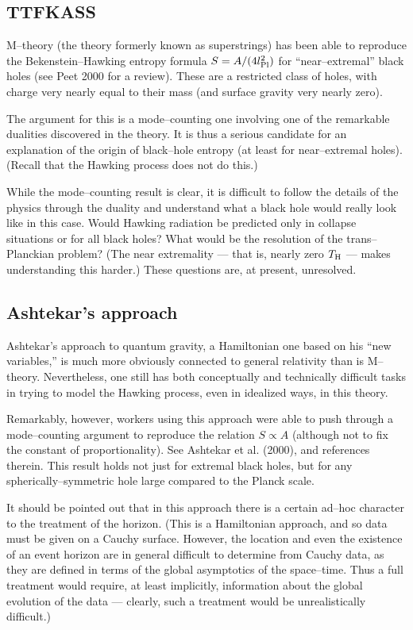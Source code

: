 \subsection{TTFKASS}

M--theory (the theory formerly known as superstrings) has been able to
reproduce the Bekenstein--Hawking entropy formula $S=A/(4l_{\rm Pl}^2)$ for
``near--extremal'' black holes (see Peet 2000 for a review).   These are a
restricted class of holes, with charge very nearly equal to their mass (and
surface gravity very nearly zero). 

The argument for this is a mode--counting one involving one of the remarkable
dualities discovered in the theory.  It is thus a serious candidate for an
explanation of the origin of  black--hole entropy (at least for near--extremal
holes).   (Recall that the Hawking process does not do this.)

While the mode--counting result is clear, it is difficult to follow the details
of the physics through the duality and understand what a black hole would
really look like in this case.  Would Hawking radiation be predicted only in
collapse situations or for all black holes?   What would be the resolution of
the trans--Planckian problem?  (The near extremality --- that is, nearly zero
$T_{\rm H}$ --- makes understanding this harder.)  These questions are, at
present, unresolved.

\subsection{Ashtekar's approach}

Ashtekar's approach to quantum gravity, a Hamiltonian one based on his ``new
variables,'' is much more obviously connected to general relativity than is
M--theory.  Nevertheless,  one still has both conceptually and technically
difficult tasks in trying to model the Hawking process, even in idealized ways,
in this theory.  

Remarkably, however, workers using this approach were able to push through a
mode--counting argument to reproduce the relation $S\propto A$ (although not to
fix the constant of proportionality).  See Ashtekar et al. (2000), and
references therein.  This result holds not just for extremal black holes, but
for any spherically--symmetric hole large compared to the Planck scale.  

It should be pointed out that in this approach there is a certain ad--hoc
character to the treatment of the horizon.  (This is a Hamiltonian approach,
and so data must be given on a Cauchy surface.  However, the location and even
the existence of an event horizon are in general difficult to determine from
Cauchy data, as they are defined in terms of the global asymptotics of the
space--time. Thus a full treatment would require, at least implicitly,
information about the global evolution of the data --- clearly, such a
treatment would be unrealistically difficult.)

